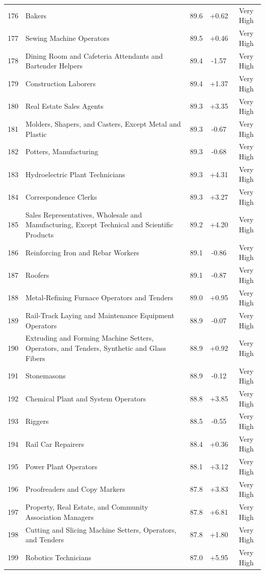 {\begin{longtable}{rp{7cm}ccc}
176 & Bakers & 89.6 & +0.62 & Very High \\
177 & Sewing Machine Operators & 89.5 & +0.46 & Very High \\
178 & Dining Room and Cafeteria Attendants and Bartender Helpers & 89.4 & -1.57 & Very High \\
179 & Construction Laborers & 89.4 & +1.37 & Very High \\
180 & Real Estate Sales Agents & 89.3 & +3.35 & Very High \\
181 & Molders, Shapers, and Casters, Except Metal and Plastic & 89.3 & -0.67 & Very High \\
182 & Potters, Manufacturing & 89.3 & -0.68 & Very High \\
183 & Hydroelectric Plant Technicians & 89.3 & +4.31 & Very High \\
184 & Correspondence Clerks & 89.3 & +3.27 & Very High \\
185 & Sales Representatives, Wholesale and Manufacturing, Except Technical and Scientific Products & 89.2 & +4.20 & Very High \\
186 & Reinforcing Iron and Rebar Workers & 89.1 & -0.86 & Very High \\
187 & Roofers & 89.1 & -0.87 & Very High \\
188 & Metal-Refining Furnace Operators and Tenders & 89.0 & +0.95 & Very High \\
189 & Rail-Track Laying and Maintenance Equipment Operators & 88.9 & -0.07 & Very High \\
190 & Extruding and Forming Machine Setters, Operators, and Tenders, Synthetic and Glass Fibers & 88.9 & +0.92 & Very High \\
191 & Stonemasons & 88.9 & -0.12 & Very High \\
192 & Chemical Plant and System Operators & 88.8 & +3.85 & Very High \\
193 & Riggers & 88.5 & -0.55 & Very High \\
194 & Rail Car Repairers & 88.4 & +0.36 & Very High \\
195 & Power Plant Operators & 88.1 & +3.12 & Very High \\
196 & Proofreaders and Copy Markers & 87.8 & +3.83 & Very High \\
197 & Property, Real Estate, and Community Association Managers & 87.8 & +6.81 & Very High \\
198 & Cutting and Slicing Machine Setters, Operators, and Tenders & 87.8 & +1.80 & Very High \\
199 & Robotics Technicians & 87.0 & +5.95 & Very High \\

\end{longtable}}
